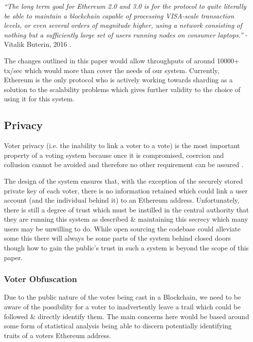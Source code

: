 \documentclass{article}
\begin{document}
	\textit{``The long term goal for Ethereum 2.0 and 3.0 is for the protocol to quite literally be able to maintain a blockchain capable of processing VISA-scale transaction levels, or even several orders of magnitude higher, using a network consisting of nothing but a sufficiently large set of users running nodes on consumer laptops.''} - Vitalik Buterin, 2016 \citep{74_ethereum_announces_unlimited_scalability_roadmap}.
	
	The changes outlined in this paper would allow throughputs of around 10000+ tx/sec \citep{75_eip_105} which would more than cover the needs of our system. Currently, Ethereum is the only protocol who is actively working towards sharding as a solution to the scalability problems which gives further validity to the choice of using it for this system.
	
	\cleardoublepage
	\subsection{Privacy}
	Voter privacy (i.e. the inability to link a voter to a vote) is the most important property of a voting system because once it is compromised, coercion and collusion cannot be avoided and therefore no other requirement can be assured \citep{48_safevote_2001}. 
	
	The design of the system ensures that, with the exception of the securely stored private key of each voter, there is no information retained which could link a user account (and the individual behind it) to an Ethereum address. Unfortunately, there is still a degree of trust which must be instilled in the central authority that they are running this system as described \& maintaining this secrecy which many users may be unwilling to do. While open sourcing the codebase could alleviate some this there will always be some parts of the system behind closed doors though how to gain the public's trust in such a system is beyond the scope of this paper.
	
	\subsubsection{Voter Obfuscation}
	Due to the public nature of the votes being cast in a Blockchain, we need to be aware of the possibility for a voter to inadvertently leave a trail which could be followed \& directly identify them. The main concerns here would be based around some form of statistical analysis being able to discern potentially identifying traits of a voters Ethereum address. 
	
\end{document}
